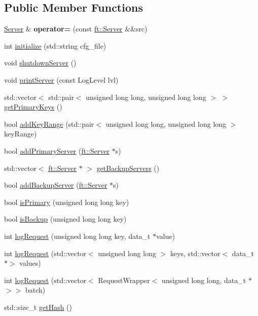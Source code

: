 \subsection*{Public Member Functions}
\begin{DoxyCompactItemize}
\item 
\mbox{\label{classft_1_1Server_a63475cd47ee0ffbbbb323059f83cbd27}} 
\mbox{\hyperlink{classft_1_1Server}{Server}} \& {\bfseries operator=} (const \mbox{\hyperlink{classft_1_1Server}{ft\+::\+Server}} \&\&src)
\item 
int \mbox{\hyperlink{classft_1_1Server_a834002a833999b593d357b72ef69ddcf}{initialize}} (std\+::string cfg\+\_\+file)
\item 
void \mbox{\hyperlink{classft_1_1Server_a4df01ccbcc6295e4930e3c65dedaa595}{shutdown\+Server}} ()
\item 
void \mbox{\hyperlink{classft_1_1Server_a0c333cc78d88ff7ada32ffff429a8788}{print\+Server}} (const Log\+Level lvl)
\item 
std\+::vector$<$ std\+::pair$<$ unsigned long long, unsigned long long $>$ $>$ \mbox{\hyperlink{classft_1_1Server_a86cc643b14f616c8ba0ecaddbbb696eb}{get\+Primary\+Keys}} ()
\item 
bool \mbox{\hyperlink{classft_1_1Server_a5f5dd98bd5956bb480f4e8564c7620cd}{add\+Key\+Range}} (std\+::pair$<$ unsigned long long, unsigned long long $>$ key\+Range)
\item 
bool \mbox{\hyperlink{classft_1_1Server_a395dbe95b7c78b48213a62b4bc2d7c9d}{add\+Primary\+Server}} (\mbox{\hyperlink{classft_1_1Server}{ft\+::\+Server}} $\ast$s)
\item 
std\+::vector$<$ \mbox{\hyperlink{classft_1_1Server}{ft\+::\+Server}} $\ast$ $>$ \mbox{\hyperlink{classft_1_1Server_a97e94c9e9c8ed5eb8282564f1d2db739}{get\+Backup\+Servers}} ()
\item 
bool \mbox{\hyperlink{classft_1_1Server_a2458eef12718b2f04129a68ddea466c3}{add\+Backup\+Server}} (\mbox{\hyperlink{classft_1_1Server}{ft\+::\+Server}} $\ast$s)
\item 
bool \mbox{\hyperlink{classft_1_1Server_ac3c476b8dad7bbb3fb39470c79dc2a6e}{is\+Primary}} (unsigned long long key)
\item 
bool \mbox{\hyperlink{classft_1_1Server_aae86da697b404a1337b94b2a1ee7d5ed}{is\+Backup}} (unsigned long long key)
\item 
int \mbox{\hyperlink{classft_1_1Server_a17e80f813ff788007ece482e5d311ffa}{log\+Request}} (unsigned long long key, data\+\_\+t $\ast$value)
\item 
int \mbox{\hyperlink{classft_1_1Server_ae97719e0790afb356374955130cb4c72}{log\+Request}} (std\+::vector$<$ unsigned long long $>$ keys, std\+::vector$<$ data\+\_\+t $\ast$$>$ values)
\item 
int \mbox{\hyperlink{classft_1_1Server_ada92c4dbf92ee02bb99be77a9faae1e2}{log\+Request}} (std\+::vector$<$ Request\+Wrapper$<$ unsigned long long, data\+\_\+t $\ast$$>$$>$ batch)
\item 
std\+::size\+\_\+t \mbox{\hyperlink{classft_1_1Server_aef123896c2f84d6bc2c5fe2940d1a8b4}{get\+Hash}} ()
\end{DoxyCompactItemize}

